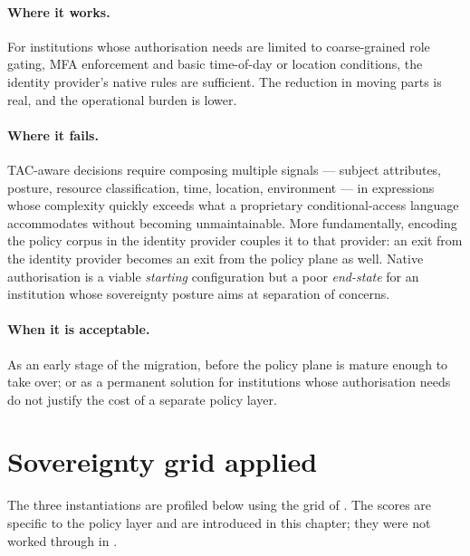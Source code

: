 \paragraph{Where it works.} For institutions whose authorisation
needs are limited to coarse-grained role gating, MFA enforcement and
basic time-of-day or location conditions, the identity provider's
native rules are sufficient. The reduction in moving parts is real,
and the operational burden is lower.

\paragraph{Where it fails.} TAC-aware decisions require composing
multiple signals --- subject attributes, posture, resource
classification, time, location, environment --- in expressions whose
complexity quickly exceeds what a proprietary conditional-access
language accommodates without becoming unmaintainable. More fundamentally,
encoding the policy corpus in the identity provider couples it to
that provider: an exit from the identity provider becomes an exit
from the policy plane as well. Native authorisation is a viable
\emph{starting} configuration but a poor \emph{end-state} for an
institution whose sovereignty posture aims at separation of
concerns.

\paragraph{When it is acceptable.} As an early stage of the
migration, before the policy plane is mature enough to take over;
or as a permanent solution for institutions whose authorisation
needs do not justify the cost of a separate policy layer.

\section{Sovereignty grid applied}
\label{sec:po-sovereignty}

The three instantiations are profiled below using the grid of
. The scores are specific to the
policy layer and are introduced in this chapter; they were not
worked through in .


